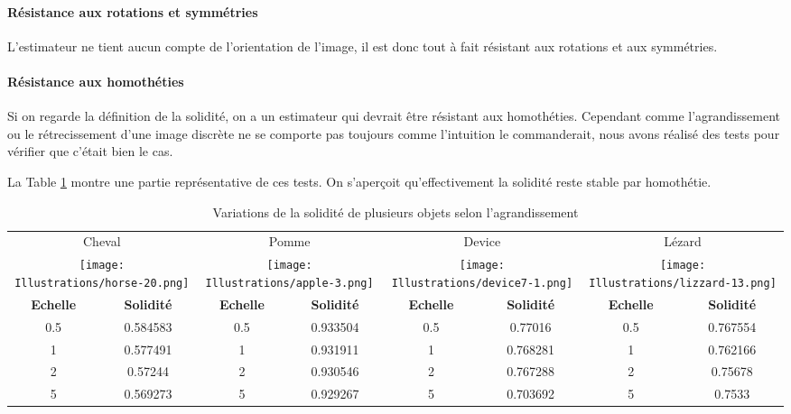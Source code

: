\documentclass{article}
\theoremstyle{definition}
\begin{document}


	\paragraph{Résistance aux rotations et symmétries}
	
	  L'estimateur ne tient aucun compte de l'orientation de l'image, il est donc tout à fait résistant aux rotations et aux symmétries.
      
	\paragraph{Résistance aux homothéties} 
	
	  Si on regarde la définition de la solidité, on a un estimateur qui devrait être résistant aux homothéties. Cependant comme l'agrandissement ou le rétrecissement d'une image discrète ne se comporte pas toujours comme l'intuition le commanderait, nous avons réalisé des tests pour vérifier que c'était bien le cas.
	  
	  La Table \ref{solidité-scaling-table} montre une partie représentative de ces tests. On s'aperçoit qu'effectivement la solidité reste stable par homothétie.\\
	
	  \begin{table}[!h]
	  \centering
	  \begin{tabular}{|c|c|c|c|c|c|c|c|}
	    \hline
	    \multicolumn{2}{|c|}{Cheval} & \multicolumn{2}{|c|}{Pomme} & \multicolumn{2}{|c|}{Device} & \multicolumn{2}{|c|}{Lézard} \\
	    \multicolumn{2}{|c|}{\texttt{[image: Illustrations/horse-20.png]}} 
	    & \multicolumn{2}{|c|}{\texttt{[image: Illustrations/apple-3.png]}} 
	    & \multicolumn{2}{|c|}{\texttt{[image: Illustrations/device7-1.png]}} 
	    & \multicolumn{2}{|c|}{\texttt{[image: Illustrations/lizzard-13.png]}} \\
	    \hline
	    \textbf{Echelle} & \textbf{Solidité} & \textbf{Echelle} & \textbf{Solidité} & \textbf{Echelle} & \textbf{Solidité} & \textbf{Echelle} & \textbf{Solidité} \\
	    \hline
	    0.5 & 0.584583 & 0.5 & 0.933504 & 0.5 & 0.77016 & 0.5 & 0.767554 \\
	    \hline
	    1 & 0.577491 & 1 & 0.931911 & 1 & 0.768281 & 1 & 0.762166 \\
	    \hline
	    2 & 0.57244 & 2 & 0.930546 & 2 & 0.767288 & 2 & 0.75678 \\
	    \hline
	    5 & 0.569273 & 5 & 0.929267 & 5 & 0.703692 & 5 & 0.7533 \\
	    \hline
	  \end{tabular}
	  \caption{Variations de la solidité de plusieurs objets selon l'agrandissement}
	  \label{solidité-scaling-table}
	  \end{table}
	  
\end{document}
